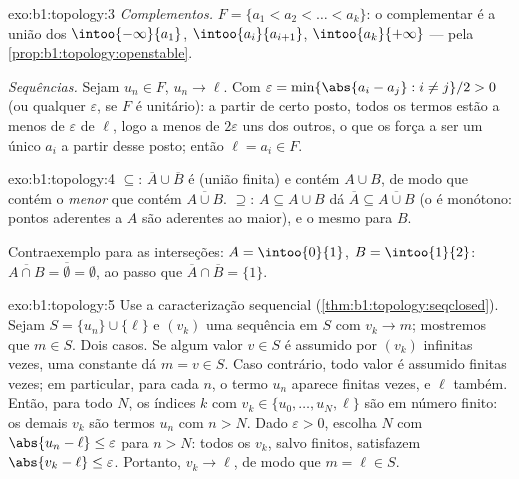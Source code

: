 \begin{solution}{exo:b1:topology:3}
\emph{Complementos.} $F = \{a_1 < a_2 < \dots < a_k\}$: o complementar
é a união dos   $\intoo{-\infty}{a_1}$,
$\intoo{a_i}{a_{i+1}}$, $\intoo{a_k}{+\infty}$ ---  pela
\cref{prop:b1:topology:openstable}.

\emph{Sequências.} Sejam $u_n \in F$, $u_n \to \ell$. Com $\varepsilon
= \min\{\abs{a_i - a_j} : i \neq j\}/2 > 0$ (ou qualquer $\varepsilon$, se
$F$ é unitário): a partir de certo posto, todos os termos estão a menos
de $\varepsilon$ de $\ell$, logo a menos de $2\varepsilon$ uns dos outros,
o que os força a ser um único $a_i$ a partir desse posto; então
$\ell = a_i \in F$.
\end{solution}

\begin{solution}{exo:b1:topology:4}
$\subseteq$: $\overline A \cup \overline B$ é  (união finita)
e contém $A \cup B$, de modo que contém o \emph{menor}  que
contém $\overline{A \cup B}$. $\supseteq$: $A \subseteq A \cup B$
dá $\overline A \subseteq \overline{A \cup B}$ (o  é monótono: pontos aderentes a $A$ são
aderentes ao  maior), e o mesmo para $B$.

Contraexemplo para as interseções: $A = \intoo{0}{1}$, $B =
\intoo{1}{2}$: $\overline{A \cap B} = \overline\emptyset = \emptyset$,
ao passo que $\overline A \cap \overline B = \{1\}$.
\end{solution}

\begin{solution}{exo:b1:topology:5}
Use a caracterização sequencial
(\cref{thm:b1:topology:seqclosed}). Sejam $S = \{u_n\} \cup \{\ell\}$
e $(v_k)$ uma sequência em $S$ com $v_k \to m$; mostremos que $m \in S$. Dois
casos. Se algum valor $v \in S$ é assumido por $(v_k)$ infinitas vezes,
uma  constante dá $m = v \in S$. Caso contrário, todo
valor é assumido finitas vezes; em particular, para cada $n$, o termo
$u_n$ aparece finitas vezes, e $\ell$ também. Então, para todo $N$, os
índices $k$ com $v_k \in \{u_0, \dots, u_N, \ell\}$ são em número finito:
os demais $v_k$ são termos $u_n$ com $n > N$. Dado
$\varepsilon > 0$, escolha $N$ com $\abs{u_n - \ell} \leq
\varepsilon$ para $n > N$: todos os $v_k$, salvo finitos, satisfazem
$\abs{v_k - \ell} \leq \varepsilon$. Portanto, $v_k \to \ell$, de modo que $m =
\ell \in S$.
\end{solution}

